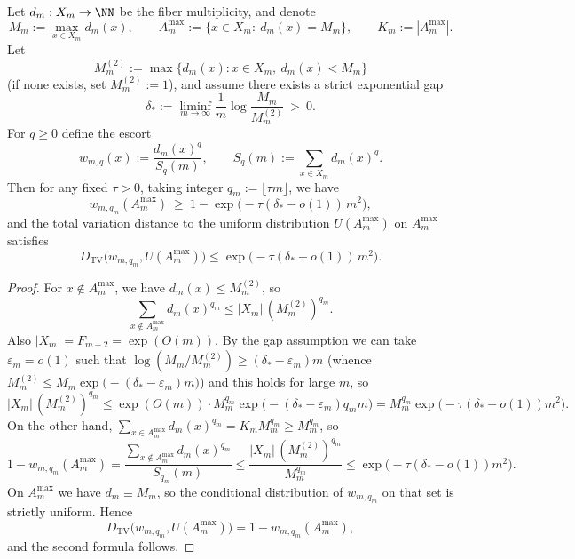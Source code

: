 \begin{conclusion}[Diagonal zero-temperature selection principle: escorts with \texorpdfstring{$q=\tau m$}{q=tau m} concentrate on the maximal fiber set with \(e^{-\Theta(m^2)}\)]\label{con:xi-terminal-diagonal-zero-temp-maxset-concentration}
Let \(d_m:X_m\to\NN\) be the fiber multiplicity, and denote
\[
M_m:=\max_{x\in X_m}d_m(x),\qquad
A_m^{\max}:=\{x\in X_m:\ d_m(x)=M_m\},\qquad
K_m:=|A_m^{\max}|.
\]
Let
\[
M_m^{(2)}:=\max\{d_m(x):x\in X_m,\ d_m(x)<M_m\}
\]
(if none exists, set \(M_m^{(2)}:=1\)), and assume there exists a strict exponential gap
\[
\delta_\ast:=\liminf_{m\to\infty}\frac{1}{m}\log\frac{M_m}{M_m^{(2)}}\ >\ 0.
\]
For \(q\ge 0\) define the escort
\[
w_{m,q}(x):=\frac{d_m(x)^q}{S_q(m)},\qquad S_q(m):=\sum_{x\in X_m}d_m(x)^q.
\]
Then for any fixed \(\tau>0\), taking integer \(q_m:=\lfloor \tau m\rfloor\), we have
\[
w_{m,q_m}(A_m^{\max})\ \ge\ 1-\exp\!\bigl(-\tau(\delta_\ast-o(1))\,m^2\bigr),
\]
and the total variation distance to the uniform distribution \(U(A_m^{\max})\) on \(A_m^{\max}\) satisfies
\[
D_{\mathrm{TV}}\!\bigl(w_{m,q_m},U(A_m^{\max})\bigr)
\le \exp\!\bigl(-\tau(\delta_\ast-o(1))\,m^2\bigr).
\]
\end{conclusion}
\begin{proof}
For \(x\notin A_m^{\max}\), we have \(d_m(x)\le M_m^{(2)}\), so
\[
\sum_{x\notin A_m^{\max}}d_m(x)^{q_m}\le |X_m|\,(M_m^{(2)})^{q_m}.
\]
Also \(|X_m|=F_{m+2}=\exp(O(m))\).
By the gap assumption we can take \(\varepsilon_m=o(1)\) such that \(\log(M_m/M_m^{(2)})\ge (\delta_\ast-\varepsilon_m)m\)
(whence \(M_m^{(2)}\le M_m\exp\bigl(-(\delta_\ast-\varepsilon_m)m\bigr)\)) and this holds for large \(m\), so
\[
|X_m|\,(M_m^{(2)})^{q_m}
\le
\exp(O(m))\cdot M_m^{q_m}\exp\!\bigl(-(\delta_\ast-\varepsilon_m)q_m m\bigr)
=M_m^{q_m}\exp\!\bigl(-\tau(\delta_\ast-o(1))m^2\bigr).
\]
On the other hand,
\(
\sum_{x\in A_m^{\max}}d_m(x)^{q_m}=K_m M_m^{q_m}\ge M_m^{q_m}
\), so
\[
1-w_{m,q_m}(A_m^{\max})
=\frac{\sum_{x\notin A_m^{\max}}d_m(x)^{q_m}}{S_{q_m}(m)}
\le
\frac{|X_m|\,(M_m^{(2)})^{q_m}}{M_m^{q_m}}
\le \exp\!\bigl(-\tau(\delta_\ast-o(1))m^2\bigr).
\]
On \(A_m^{\max}\) we have \(d_m\equiv M_m\), so the conditional distribution of \(w_{m,q_m}\) on that set is strictly uniform.
Hence
\[
D_{\mathrm{TV}}\!\bigl(w_{m,q_m},U(A_m^{\max})\bigr)
=1-w_{m,q_m}(A_m^{\max}),
\]
and the second formula follows.
\end{proof}

